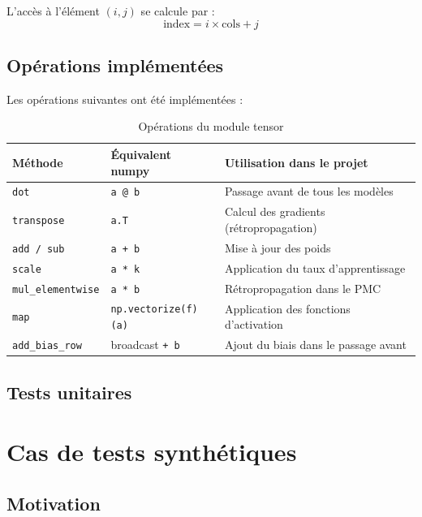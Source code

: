 \documentclass[12pt, a4paper]{report}
\begin{document}
L'accès à l'élément $(i, j)$ se calcule par :
\[
    \text{index} = i \times \text{cols} + j
\]

\subsection{Opérations implémentées}


Les opérations suivantes ont été implémentées :

\begin{table}[H]
\centering
\begin{tabular}{lll}
\toprule
\textbf{Méthode} & \textbf{Équivalent numpy} & \textbf{Utilisation dans le projet} \\
\midrule
\texttt{dot} & \texttt{a @ b} & Passage avant de tous les modèles \\
\texttt{transpose} & \texttt{a.T} & Calcul des gradients (rétropropagation) \\
\texttt{add / sub} & \texttt{a + b} & Mise à jour des poids \\
\texttt{scale} & \texttt{a * k} & Application du taux d'apprentissage \\
\texttt{mul\_elementwise} & \texttt{a * b} & Rétropropagation dans le PMC \\
\texttt{map} & \texttt{np.vectorize(f)(a)} & Application des fonctions d'activation \\
\texttt{add\_bias\_row} & broadcast \texttt{+ b} & Ajout du biais dans le passage avant \\
\bottomrule
\end{tabular}
\caption{Opérations du module tensor}
\end{table}

\subsection{Tests unitaires}


\section{Cas de tests synthétiques}

\subsection{Motivation}
\end{document}
